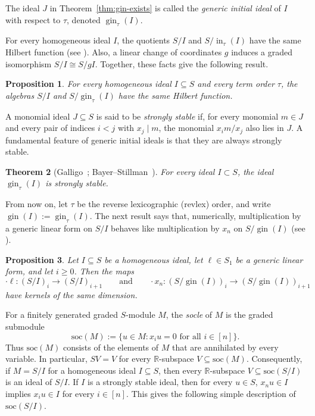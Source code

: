 \documentclass[11pt]{article}
\newtheorem{theorem}{Theorem}[section]
\newtheorem{proposition}[theorem]{Proposition}
\theoremstyle{definition}
\numberwithin{equation}{theorem}
\DeclareMathOperator{\gin}{gin}
\newcommand{\kk}{{\mathbb R}}
\newcommand{\Soc}{\mathrm{soc}}
\begin{document}
\noindent The ideal $J$ in Theorem~\ref{thm:gin-exists} is called the \emph{generic initial ideal} of $I$ with respect to $\tau$, denoted $\operatorname{gin}_\tau(I)$. %

For every homogeneous ideal $I$, the quotients $S/I$ and $S/\operatorname{in}_\tau(I)$ have the same Hilbert function (see \cite[Cor.~6.1.5]{HerzogHibi2011}). Also, a linear change of coordinates $g$ induces a graded isomorphism $S/I\cong S/gI$. Together, these facts give the following result.


\begin{proposition}\label{prop:gin-hilbert}
For every homogeneous ideal $I \subseteq S$ and every term order $\tau$, the algebras
$S/I$ and $S/\operatorname{gin}_\tau(I)$ have the same Hilbert function.
\end{proposition}

A monomial ideal $J\subseteq S$ is said to be \emph{strongly stable} if, for every monomial $m\in J$ and every pair of indices $i<j$ with $x_j\mid m$, the monomial $x_im/x_j$ also lies in $J$. 
A fundamental feature of generic initial ideals is that they are always strongly stable.

\begin{theorem}[Galligo~\cite{Galligo1974}; Bayer--Stillman~\cite{BayerStillman1987}]\label{thm:gin-Borel-fixed} 
For every ideal $I\subset S$, the ideal $\operatorname{gin}_\tau(I)$ is strongly stable.
\end{theorem}

From now on, let $\tau$ be the reverse lexicographic (revlex) order, and write $\operatorname{gin}(I):=\operatorname{gin}_\tau(I)$. The next result says that, numerically, multiplication by a generic linear form on $S/I$ behaves like multiplication by $x_n$ on $S/\operatorname{gin}(I)$ (see \cite[Thm.~4.3.6]{HerzogHibi2011}).


\begin{proposition}\label{prop:gin-multiplication}
Let $I \subseteq S$ be a homogeneous ideal, let $\ell \in S_1$ be a generic linear form, and let $i \ge 0$. Then the maps
\[
\cdot \ell \colon (S/I)_i \to (S/I)_{i+1}
\qquad\text{and}\qquad
\cdot x_n \colon (S/\gin(I))_i \to (S/\gin(I))_{i+1}
\]
have kernels of the same dimension.
\end{proposition}




For a finitely generated graded $S$-module $M$, the \emph{socle} of $M$ is the graded
submodule
\[
  \Soc(M):=%
  \{u\in M : x_iu=0 \text{ for all } i\in[n]\}.
\]
Thus $\Soc(M)$ consists of the elements of $M$ that are annihilated by every variable. In particular, $SV=V$ for every $\kk$-subspace $V\subseteq\Soc(M)$. Consequently, if $M=S/I$ for a homogeneous ideal $I\subseteq S$, then every $\kk$-subspace $V\subseteq\Soc(S/I)$ is an ideal of $S/I$.
If $I$ is a strongly stable ideal, then for every $u\in S$, $x_nu\in I$ implies $x_iu\in I$ for every $i\in[n]$. This gives the following simple description of $\Soc(S/I)$.
\end{document}
